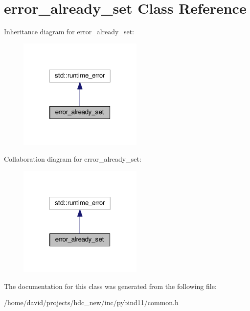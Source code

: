 \hypertarget{classerror__already__set}{}\section{error\+\_\+already\+\_\+set Class Reference}
\label{classerror__already__set}


Inheritance diagram for error\+\_\+already\+\_\+set\+:
\nopagebreak
\begin{figure}[H]
\begin{center}
\leavevmode
\includegraphics[width=173pt]{classerror__already__set__inherit__graph}
\end{center}
\end{figure}


Collaboration diagram for error\+\_\+already\+\_\+set\+:
\nopagebreak
\begin{figure}[H]
\begin{center}
\leavevmode
\includegraphics[width=173pt]{classerror__already__set__coll__graph}
\end{center}
\end{figure}


The documentation for this class was generated from the following file\+:\begin{DoxyCompactItemize}
\item 
/home/david/projects/hdc\+\_\+new/inc/pybind11/common.\+h\end{DoxyCompactItemize}

